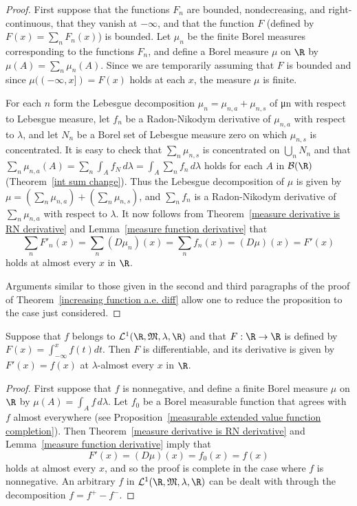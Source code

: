 \begin{proof}
First suppose that the functions $F_n$ are bounded, nondecreasing, and right-continuous, that they vanish at $-\infty$, and that the function $F$ (defined by $F(x)=\sum_nF_n(x)$) is bounded. Let $\mu_n$ be the finite Borel measures corresponding to the functions $F_n$, and define a Borel measure $\mu$ on $\R$ by $\mu(A)=\sum_n\mu_n(A)$. Since we are temporarily assuming that $F$ is bounded and since $\mu((-\infty,x])=F(x)$ holds at each $x$, the measure $\mu$ is finite.\par
For each $n$ form the Lebesgue decomposition $\mu_n=\mu_{n,a}+\mu_{n,s}$ of μn with respect to Lebesgue measure, let $f_n$ be a Radon-Nikodym derivative of $\mu_{n,a}$ with respect to $\lambda$, and let $N_n$ be a Borel set of Lebesgue measure zero on which $\mu_{n,s}$ is concentrated. It is easy to check that $\sum_n\mu_{n,s}$ is concentrated on $\bigcup_nN_n$ and that $\sum_{n}\mu_{n,a}(A)=\sum_n\int_Af_N\,d\lambda=\int_A\sum_nf_n\,d\lambda$ holds for each $A$ in $\mathcal{B}(\R)$ (Theorem~\ref{int sum change}). Thus the Lebesgue decomposition of $\mu$ is given by $\mu=(\sum_n\mu_{n,a})+(\sum_n\mu_{n,s})$, and $\sum_nf_n$ is a Radon-Nikodym derivative of $\sum_n\mu_{n,a}$ with respect to $\lambda$. It now follows from Theorem~\ref{measure derivative is RN derivative} and Lemma~\ref{measure function derivative} that
\[\sum_nF'_n(x)=\sum_n(D\mu_n)(x)=\sum_nf_n(x)=(D\mu)(x)=F'(x)\]
holds at almost every $x$ in $\R$.\par
Arguments similar to those given in the second and third paragraphs of the proof of Theorem~\ref{increasing function a.e. diff} allow one to reduce the proposition to the case just considered.
\end{proof}
\begin{theorem}\label{function given by integral is differentiable}
Suppose that $f$ belongs to $\mathcal{L}^1(\R,\mathfrak{M},\lambda,\R)$ and that $F:\R\to\R$ is defined by $F(x)=\int_{-\infty}^{x}f(t)dt$. Then $F$ is differentiable, and its derivative is given by $F'(x)=f(x)$ at $\lambda$-almost every $x$ in $\R$.
\end{theorem}
\begin{proof}
First suppose that $f$ is nonnegative, and define a finite Borel measure $\mu$ on $\R$ by $\mu(A)=\int_Af\,d\lambda$. Let $f_0$ be a Borel measurable function that agrees with $f$ almost everywhere (see Proposition~\ref{measurable extended value function completion}). Then Theorem~\ref{measure derivative is RN derivative} and Lemma~\ref{measure function derivative} imply that
\[F'(x)=(D\mu)(x)=f_0(x)=f(x)\]
holds at almost every $x$, and so the proof is complete in the case where $f$ is nonnegative. An arbitrary $f$ in $\mathcal{L}^1(\R,\mathfrak{M},\lambda,\R)$ can be dealt with through the decomposition $f=f^+-f^-$.
\end{proof}
